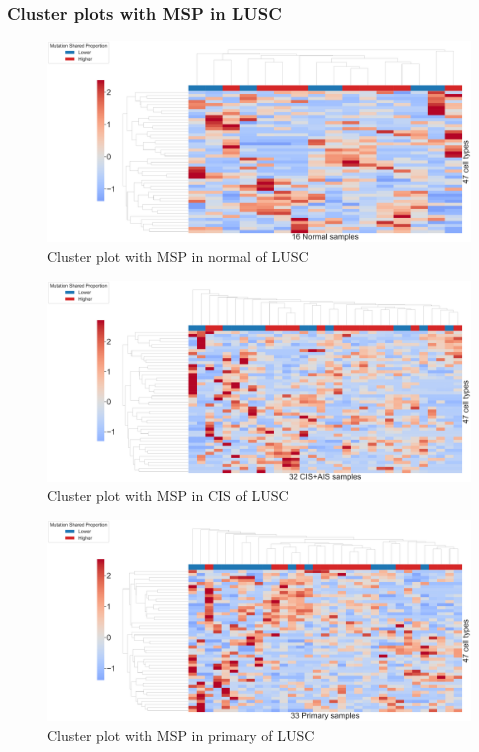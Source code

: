 \documentclass{beamer}
\begin{document}
                \begin{frame}[allowframebreaks]
                    \frametitle{Cluster plots with MSP in LUSC}

                    \begin{figure}
                        \includegraphics[width=0.9 \linewidth]{figures/BisqueRNA/clustermap/STAR.TPM.GSE131907.SQC.MSP-median/Mutation Shared Proportion-Normal.pdf}
                        \caption{Cluster plot with MSP in normal of LUSC}
                    \end{figure}

                    \begin{figure}
                        \includegraphics[width=0.9 \linewidth]{figures/BisqueRNA/clustermap/STAR.TPM.GSE131907.SQC.MSP-median/Mutation Shared Proportion-CIS+AIS.pdf}
                        \caption{Cluster plot with MSP in CIS of LUSC}
                    \end{figure}

                    \begin{figure}
                        \includegraphics[width=0.9 \linewidth]{figures/BisqueRNA/clustermap/STAR.TPM.GSE131907.SQC.MSP-median/Mutation Shared Proportion-Primary.pdf}
                        \caption{Cluster plot with MSP in primary of LUSC}
                    \end{figure}
                \end{frame}
\end{document}
